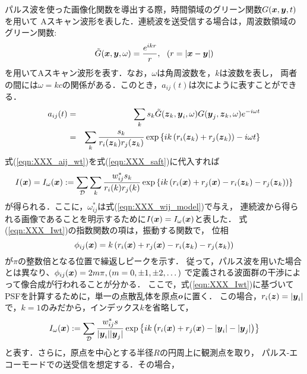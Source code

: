 パルス波を使った画像化関数を導出する際，時間領域のグリーン関数$G(\mbox{\boldmath $x$},\mbox{\boldmath $y$},t)$を用いて
Aスキャン波形を表した．連続波を送受信する場合は，周波数領域のグリーン関数:
\begin{equation}
	\tilde G(\mbox{\boldmath $x$},\mbox{\boldmath $y$},\omega)
	=
	\frac{e^{ikr}}{r}, \ \ (r=\left| \mbox{\boldmath $x$}-\mbox{\boldmath $y$} \right|)
	\label{eqn:}
\end{equation}
を用いてAスキャン波形を表す．なお，$\omega$は角周波数を，$k$は波数を表し，
両者の間には$\omega=kc$の関係がある．このとき，$a_{ij}(t)$は次にように表すことができる．
\begin{eqnarray}
	a_{ij}(t)
	&=&
	\sum_k 
	s_k \tilde G(\mbox{\boldmath $z$}_k,\mbox{\boldmath $y$}_i,\omega)G(\mbox{\boldmath $y$}_j,\mbox{\boldmath $z$}_k,\omega)e^{-i\omega t} \\
	&=&
	\sum_k \frac{s_k}{r_i(\mbox{\boldmath $z$}_k)r_j(\mbox{\boldmath $z$}_k)}
	\exp\left\{
		ik\left( 
			r_i(\mbox{\boldmath $z$}_k)+r_j(\mbox{\boldmath $z$}_k)
		\right)
		-i\omega t
	\right\}
	\label{eqn:XXX_aij_wt}
\end{eqnarray}
式(\ref{eqn:XXX_aij_wt})を式(\ref{eqn:XXX_saft})に代入すれば
\begin{equation}
	I(\mbox{\boldmath $x$})
		=
	I_\omega(\mbox{\boldmath $x$})
		:=
	\sum_{\cal D} \sum_{k}
	\frac{w_{ij}^*s_k}{r_i(k)r_j(k)} 
	\exp \left\{ 
	ik
	\left(
		r_i(\mbox{\boldmath $x$})+r_j(\mbox{\boldmath $x$})-r_i(\mbox{\boldmath $z$}_k)-r_j(\mbox{\boldmath $z$}_k)
	\right)
	\right\} 
	\label{eqn:XXX_Iwt}
\end{equation}
が得られる．ここに，$\omega_{ij}^*$は式(\ref{eqn:XXX_wij_model})で与え，
連続波から得られる画像であることを明示するために$I(\mbox{\boldmath $x$})=I_\omega(\mbox{\boldmath $x$})$と表した．
式(\ref{eqn:XXX_Iwt})の指数関数の項は，振動する関数で，
位相
\begin{equation}
	\phi_{ij}(\mbox{\boldmath $x$})=k 
	\left(
		r_i(\mbox{\boldmath $x$})+r_j(\mbox{\boldmath $x$})-r_i(\mbox{\boldmath $z$}_k)-r_j(\mbox{\boldmath $z$}_k)
	\right)
	\label{eqn:}
\end{equation}
が$\pi$の整数倍となる位置で繰返しピークを示す．
従って，パルス波を用いた場合とは異なり、$\phi_{ij}(\mbox{\boldmath $x$})=2m\pi, (m=0,\pm 1, \pm 2,\dots)$
で定義される波面群の干渉によって像合成が行われることが分かる．
ここで，式(\ref{eqn:XXX_Iwt})に基づいてPSFを計算するために，単一の点散乱体を原点$\mbox{\boldmath $o$}$に置く．
この場合，$r_i(\mbox{\boldmath $z$})=|\mbox{\boldmath $y$}_i|$で，$k=1$のみだから，インデックス$k$を省略して，
\begin{equation}
	I_\omega(\mbox{\boldmath $x$})
		:=
	\sum_{\cal D} 
	\frac{w_{ij}^*s}{|\mbox{\boldmath $y$}_i||\mbox{\boldmath $y$}_j|} 
	\exp \left\{ 
	ik
	\left(
		r_i(\mbox{\boldmath $x$})+r_j(\mbox{\boldmath $x$})-|\mbox{\boldmath $y$}_i|-|\mbox{\boldmath $y$}_j|
	\right)
	\right\}
	\label{eqn:}
\end{equation}
と表す．さらに，原点を中心とする半径$R$の円周上に観測点を取り，
パルス-エコーモードでの送受信を想定する．その場合，
